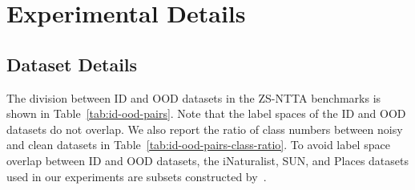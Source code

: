 \section{Experimental Details}\label{app:exp-details}
\subsection{Dataset Details}\label{app:dataset_details}
The division between ID and OOD datasets in the ZS-NTTA benchmarks is shown in Table~\ref{tab:id-ood-pairs}. Note that the label spaces of the ID and OOD datasets do not overlap. We also report the ratio of class numbers between noisy and clean datasets in Table~\ref{tab:id-ood-pairs-class-ratio}. To avoid label space overlap between ID and OOD datasets, the iNaturalist, SUN, and Places datasets used in our experiments are subsets constructed by~\cite{huang2021mos}.


\begin{table}[ht]
  \caption{ID/OOD Dataset Division. $\checkmark$ indicates an ID-OOD pair, while $\times$ indicates it is not.}
  \label{tab:id-ood-pairs}
  \vspace{5pt}
  \centering
\end{table}


